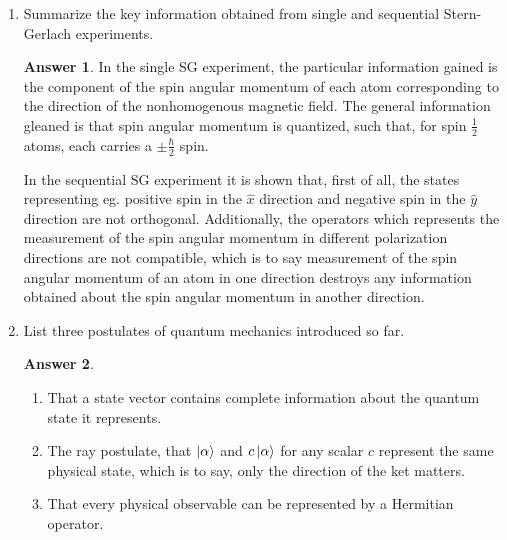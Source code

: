 \documentclass[12pt]{article}
\newenvironment{problem}[2][Problem]{\begin{trivlist}
    \item[\hskip \labelsep {\bfseries #1}\hskip \labelsep {\bfseries #2.}]}{\end{trivlist}}
\theoremstyle{definition}
\newtheorem*{answer}{Answer}
\begin{document}
\begin{problem}{1}\hfill
  \begin{enumerate}[label=(\alph*)]
    \item Summarize the key information obtained from single and sequential Stern-Gerlach experiments.
          \begin{answer}
          In the single SG experiment, the particular information gained is the component of the spin angular momentum of each atom corresponding to the direction of the nonhomogenous magnetic field.
          The general information gleaned is that spin angular momentum is quantized, such that, for spin \( \frac{1}{2} \) atoms, each carries a \( \pm \frac{\hbar}{2}\) spin.

          In the sequential SG experiment it is shown that, first of all, the states representing eg. positive spin in the \( \hat{x} \) direction and negative spin in the \( \hat{y} \) direction are not orthogonal.
          Additionally, the operators which represents the measurement of the spin angular momentum in different polarization directions are not compatible, which is to say measurement of the spin angular momentum of an atom in one direction destroys any information obtained about the spin angular momentum in another direction.
          \end{answer}
          \item List three postulates of quantum mechanics introduced so far.
          \begin{answer}
            \begin{enumerate}[label=(\arabic*)]\hfill
              \item That a state vector contains complete information about the quantum state it represents.
              \item The ray postulate, that \( \ket{\alpha} \) and \( c\ket{\alpha} \) for any scalar \( c \) represent the same physical state, which is to say, only the direction of the ket matters.
              \item That every physical observable can be represented by a Hermitian operator.
            \end{enumerate}
          \end{answer}
  \end{enumerate}
\end{problem}
\end{document}
